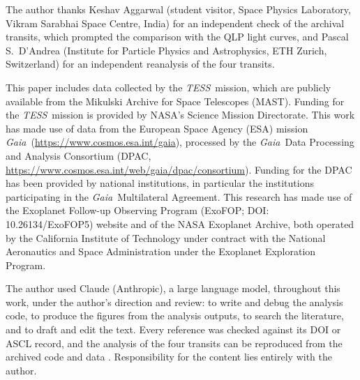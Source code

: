 \documentclass[twocolumn,linenumbers]{aastex701}
\newcommand{\tess}{\textit{TESS}}
\newcommand{\gaia}{\textit{Gaia}}
\begin{document}
\begin{acknowledgments}
The author thanks Keshav Aggarwal (student visitor, Space Physics Laboratory, Vikram Sarabhai Space Centre, India) for an independent check of the archival transits, which prompted the comparison with the QLP light curves, and Pascal S.~D'Andrea (Institute for Particle Physics and Astrophysics, ETH Zurich, Switzerland) for an independent reanalysis of the four transits.

This paper includes data collected by the \tess\ mission, which are publicly available from the Mikulski Archive for Space Telescopes (MAST). Funding for the \tess\ mission is provided by NASA's Science Mission Directorate. This work has made use of data from the European Space Agency (ESA) mission \gaia\ (\url{https://www.cosmos.esa.int/gaia}), processed by the \gaia\ Data Processing and Analysis Consortium (DPAC, \url{https://www.cosmos.esa.int/web/gaia/dpac/consortium}). Funding for the DPAC has been provided by national institutions, in particular the institutions participating in the \gaia\ Multilateral Agreement. This research has made use of the Exoplanet Follow-up Observing Program (ExoFOP; DOI: 10.26134/ExoFOP5) website and of the NASA Exoplanet Archive, both operated by the California Institute of Technology under contract with the National Aeronautics and Space Administration under the Exoplanet Exploration Program.

The author used Claude (Anthropic), a large language model, throughout this work, under the author's direction and review: to write and debug the analysis code, to produce the figures from the analysis outputs, to search the literature, and to draft and edit the text. Every reference was checked against its DOI or ASCL record, and the analysis of the four transits can be reproduced from the archived code and data \citep{DataRecord}. Responsibility for the content lies entirely with the author.

\end{acknowledgments}


\end{document}
